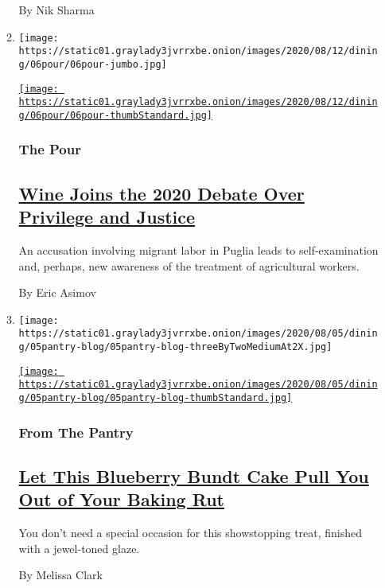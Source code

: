 \begin{enumerate}
\begin{enumerate}
    By Nik Sharma
  \item
    \texttt{[image: https://static01.graylady3jvrrxbe.onion/images/2020/08/12/dining/06pour/06pour-jumbo.jpg]}

    \href{/2020/08/06/dining/drinks/valentina-passalacqua-natural-wine-italy.html}{\texttt{[image: https://static01.graylady3jvrrxbe.onion/images/2020/08/12/dining/06pour/06pour-thumbStandard.jpg]}}

    \hypertarget{the-pour}{%
    \subsubsection{The Pour}\label{the-pour}}

    \hypertarget{wine-joins-the-2020-debate-over-privilege-and-justice}{%
    \subsection{\texorpdfstring{\href{/2020/08/06/dining/drinks/valentina-passalacqua-natural-wine-italy.html}{Wine
    Joins the 2020 Debate Over Privilege and
    Justice}}{Wine Joins the 2020 Debate Over Privilege and Justice}}\label{wine-joins-the-2020-debate-over-privilege-and-justice}}

    An accusation involving migrant labor in Puglia leads to
    self-examination and, perhaps, new awareness of the treatment of
    agricultural workers.

    By Eric Asimov
  \item
    \texttt{[image: https://static01.graylady3jvrrxbe.onion/images/2020/08/05/dining/05pantry-blog/05pantry-blog-threeByTwoMediumAt2X.jpg]}

    \href{/2020/08/05/dining/blueberry-bundt-cake.html}{\texttt{[image: https://static01.graylady3jvrrxbe.onion/images/2020/08/05/dining/05pantry-blog/05pantry-blog-thumbStandard.jpg]}}

    \hypertarget{from-the-pantry}{%
    \subsubsection{From The Pantry}\label{from-the-pantry}}

    \hypertarget{let-this-blueberry-bundt-cake-pull-you-out-of-your-baking-rut}{%
    \subsection{\texorpdfstring{\href{/2020/08/05/dining/blueberry-bundt-cake.html}{Let
    This Blueberry Bundt Cake Pull You Out of Your Baking
    Rut}}{Let This Blueberry Bundt Cake Pull You Out of Your Baking Rut}}\label{let-this-blueberry-bundt-cake-pull-you-out-of-your-baking-rut}}

    You don't need a special occasion for this showstopping treat,
    finished with a jewel-toned glaze.

    By Melissa Clark
  \end{enumerate}
\end{enumerate}

